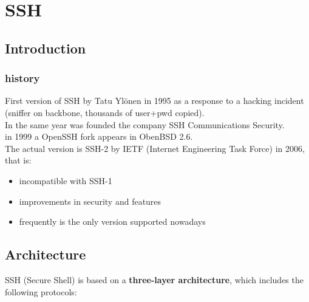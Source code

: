 \chapter{SSH}

\section{Introduction}



\subsection{history}
First version of SSH by Tatu Ylönen in 1995 as a response to a hacking incident (sniffer on backbone, thousands of user+pwd copied). \\ In the same year was founded the company SSH Communications Security. \\ in 1999 a OpenSSH fork appears in ObenBSD 2.6. \\
The actual version is SSH-2 by IETF (Internet Engineering Task Force) in 2006, that is:
\begin{itemize}
    \item incompatible with SSH-1
    \item improvements in security and features
    \item frequently is the only version supported nowadays
\end{itemize}

\section{Architecture}
SSH (Secure Shell) is based on a \textbf{three-layer architecture}, which includes the following protocols:

